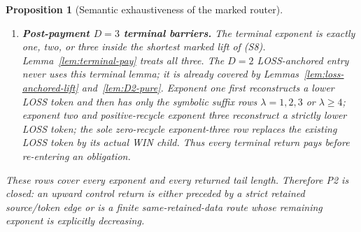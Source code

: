 \documentclass[11pt]{article}
\newtheorem{proposition}[theorem]{Proposition}
\begin{document}
\begin{proposition}[Semantic exhaustiveness of the marked router]
\begin{enumerate}[label=\textnormal{(S\arabic*)},leftmargin=*]
\item \textbf{Post-payment $D=3$ terminal barriers.}  The terminal exponent is
exactly one, two, or three inside the shortest marked lift of (S8).
Lemma~\ref{lem:terminal-pay} treats all three.  The $D=2$ LOSS-anchored entry never uses this terminal lemma; it is already
covered by Lemmas~\ref{lem:loss-anchored-lift} and~\ref{lem:D2-pure}.
Exponent one
first reconstructs a lower LOSS token and then has only the symbolic suffix
rows $\lambda=1,2,3$ or $\lambda\ge4$; exponent two and positive-recycle
exponent three reconstruct a strictly lower LOSS token; the sole
zero-recycle exponent-three row replaces the existing LOSS token by its
actual WIN child.  Thus every terminal return pays before re-entering an
obligation.
\end{enumerate}

These rows cover every exponent and every returned tail length.  Therefore
P2 is closed: an upward control return is either preceded by a strict
retained source/token edge or is a finite same-retained-data route whose
remaining exponent is explicitly decreasing.
\end{proposition}
\end{document}

